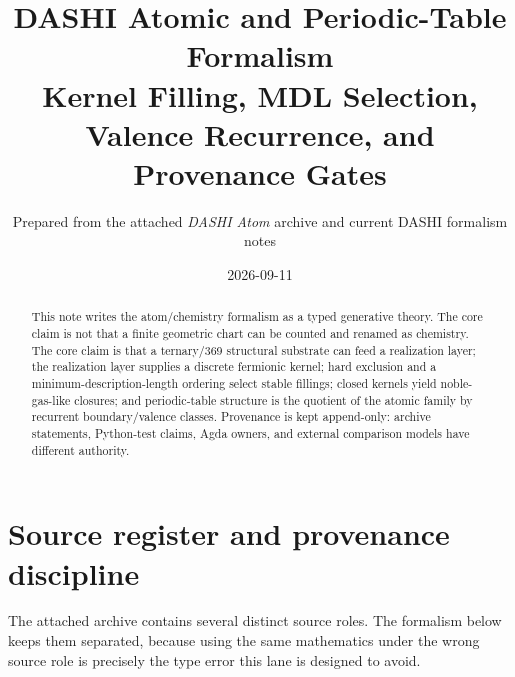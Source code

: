 \documentclass[11pt,a4paper]{article}
\title{DASHI Atomic and Periodic-Table Formalism\\
\large Kernel Filling, MDL Selection, Valence Recurrence, and Provenance Gates}
\author{Prepared from the attached \emph{DASHI Atom} archive and current DASHI formalism notes}
\date{2026-09-11}
\theoremstyle{remark}
\begin{document}
\maketitle

\begin{abstract}
This note writes the atom/chemistry formalism as a typed generative theory.  The
core claim is not that a finite geometric chart can be counted and renamed as
chemistry.  The core claim is that a ternary/369 structural substrate can feed a
realization layer; the realization layer supplies a discrete fermionic kernel;
hard exclusion and a minimum-description-length ordering select stable fillings;
closed kernels yield noble-gas-like closures; and periodic-table structure is the
quotient of the atomic family by recurrent boundary/valence classes.  Provenance
is kept append-only: archive statements, Python-test claims, Agda owners, and
external comparison models have different authority.
\end{abstract}

\tableofcontents
\newpage

\section{Source register and provenance discipline}

The attached archive contains several distinct source roles.  The formalism below
keeps them separated, because using the same mathematics under the wrong source
role is precisely the type error this lane is designed to avoid.
\end{document}
